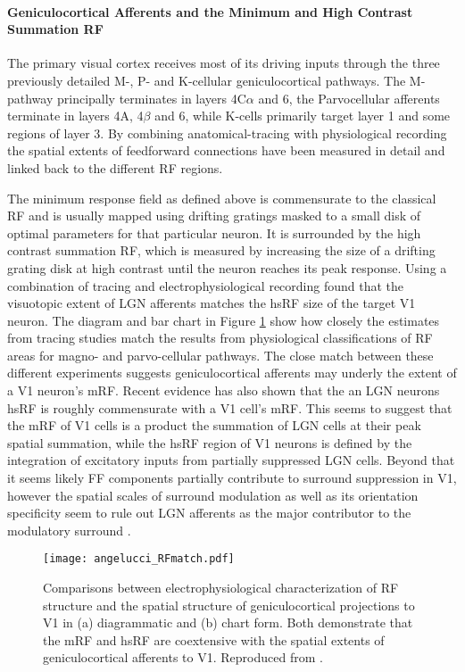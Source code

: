 \paragraph{Geniculocortical Afferents and the Minimum and High Contrast Summation RF} \label{AfferentBackground}

The primary visual cortex receives most of its driving inputs through
the three previously detailed M-, P- and K-cellular geniculocortical
pathways. The M-pathway principally terminates in layers 4C$\alpha$
and 6, the Parvocellular afferents terminate in layers 4A, 4$\beta$
and 6, while K-cells primarily target layer 1 and some regions of
layer 3. By combining anatomical-tracing with physiological
recording the spatial extents of feedforward connections have been
measured in detail and linked back to the different RF regions.

The minimum response field as defined above is commensurate to the
classical RF and is usually mapped using drifting gratings masked to a
small disk of optimal parameters for that particular neuron. It is
surrounded by the high contrast summation RF, which is measured by
increasing the size of a drifting grating disk at high contrast until
the neuron reaches its peak response. Using a combination of tracing
and electrophysiological recording \citep{Angelucci2006a} found that
the visuotopic extent of LGN afferents matches the hsRF size of the
target V1 neuron. The diagram and bar chart in Figure \ref{FFmatch}
show how closely the estimates from tracing studies match the results
from physiological classifications of RF areas for magno- and
parvo-cellular pathways. The close match between these different
experiments suggests geniculocortical afferents may underly the extent
of a V1 neuron's mRF. Recent evidence has also shown that the an LGN
neurons hsRF is roughly commensurate with a V1 cell's mRF. This seems
to suggest that the mRF of V1 cells is a product the summation of LGN
cells at their peak spatial summation, while the hsRF region of V1
neurons is defined by the integration of excitatory inputs from
partially suppressed LGN cells. Beyond that it seems likely FF
components partially contribute to surround suppression in V1, however
the spatial scales of surround modulation as well as its orientation
specificity seem to rule out LGN afferents as the major contributor to
the modulatory surround \citep{Angelucci2002,Angelucci2006a}.

\begin{figure}
	\centering
        \texttt{[image: angelucci\_RFmatch.pdf]}
	\caption[Comparison between anatomical and electrophysiological
      estimates of V1 receptive field extents. Reproduced from
      \cite{Angelucci2006}.]{Comparisons between electrophysiological
      characterization of RF structure and the spatial structure of
      geniculocortical projections to V1 in (a) diagrammatic and (b)
      chart form. Both demonstrate that the mRF and hsRF are
      coextensive with the spatial extents of geniculocortical
      afferents to V1. Reproduced from \cite{Angelucci2006}.}
	\label{FFmatch}
\end{figure}

